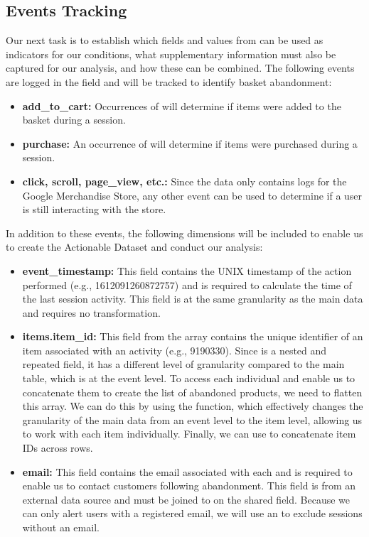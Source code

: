 \documentclass[a4paper,11pt,leqno,openbib,oldfontcommands,oneside]{memoir}
\begin{document}
\subsection{Events Tracking}
Our next task is to establish which fields and values from  can be used as indicators for our conditions, what supplementary information must also be captured for our analysis, and how these can be combined. The following events are logged in the  field and will be tracked to identify basket abandonment:

\begin{itemize}
    \item \textbf{add\_to\_cart:} Occurrences of  will determine if items were added to the basket during a session.
    \item \textbf{purchase:} An occurrence of  will determine if items were purchased during a session.
    \item \textbf{click, scroll, page\_view, etc.:} Since the data only contains logs for the Google Merchandise Store, any other event can be used to determine if a user is still interacting with the store.
\end{itemize}

\noindent In addition to these events, the following dimensions will be included to enable us to create the Actionable Dataset and conduct our analysis:

\begin{itemize}
    \item \textbf{event\_timestamp:} This field contains the UNIX timestamp of the action performed (e.g., 1612091260872757) and is required to calculate the time of the last session activity. This field is at the same granularity as the main data and requires no transformation.
    
    \item \textbf{items.item\_id:} This field from the  array contains the unique identifier of an item associated with an activity (e.g., 9190330). Since  is a nested and repeated field, it has a different level of granularity compared to the main table, which is at the event level. To access each individual  and enable us to concatenate them to create the list of abandoned products, we need to flatten this array. We can do this by using the  function, which effectively changes the granularity of the main data from an event level to the item level, allowing us to work with each item individually. Finally, we can use  to concatenate item IDs across rows.
    
    \item \textbf{email:} This field contains the email associated with each  and is required to enable us to contact customers following abandonment. This field is from an external data source and must be joined to  on the shared  field. Because we can only alert users with a registered email, we will use an  to exclude sessions without an email.
\end{itemize}
\end{document}
